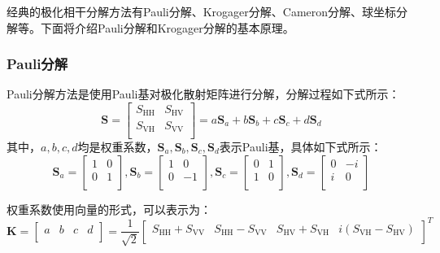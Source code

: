 经典的极化相干分解方法有Pauli分解、Krogager分解、Cameron分解、球坐标分解等。下面将介绍Pauli分解和Krogager分解的基本原理。
\subsubsection{Pauli分解}
Pauli分解方法是使用Pauli基对极化散射矩阵进行分解，分解过程如下式所示：
\begin{equation}
    \textbf{S}=\left[ \begin{matrix}
            S_{\mathrm{HH}} & S_{\mathrm{HV}} \\
            S_{\mathrm{VH}} & S_{\mathrm{VV}} \\
        \end{matrix} \right] =a\textbf{S}_a+b\textbf{S}_b+c\textbf{S}_c+d\textbf{S}_d
\end{equation}
其中，$a,b,c,d$均是权重系数，$\textbf{S}_a,\textbf{S}_b,\textbf{S}_c,\textbf{S}_d$表示Pauli基，具体如下式所示：
\begin{equation}
    \textbf{S}_a=\left[ \begin{matrix}
            1 & 0 \\
            0 & 1 \\
        \end{matrix} \right] ,\textbf{S}_b=\left[ \begin{matrix}
            1 & 0  \\
            0 & -1 \\
        \end{matrix} \right] ,\textbf{S}_c=\left[ \begin{matrix}
            0 & 1 \\
            1 & 0 \\
        \end{matrix} \right] ,\textbf{S}_d=\left[ \begin{matrix}
            0 & -i \\
            i & 0  \\
        \end{matrix} \right]
\end{equation}

权重系数使用向量的形式，可以表示为：
\begin{equation}
    \textbf{K}=\left[ \begin{matrix}
            a & b & c & d \\
        \end{matrix} \right] =\frac{1}{\sqrt{2}}\left[ \begin{matrix}
            S_{\mathrm{HH}}+S_{\mathrm{VV}} & S_{\mathrm{HH}}-S_{\mathrm{VV}} & S_{\mathrm{HV}}+S_{\mathrm{VH}} & i\left( S_{\mathrm{VH}}-S_{\mathrm{HV}} \right) \\
        \end{matrix} \right] ^T
\end{equation}

